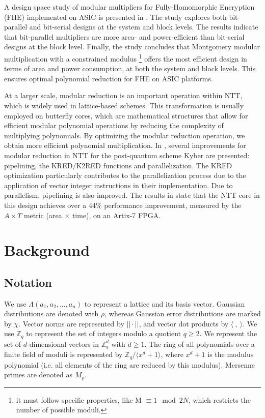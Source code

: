 \documentclass[11pt,
  titlepage=false,
  abstract=on,
]{scrreprt}
\begin{document}
A design space study of modular multipliers for Fully-Homomorphic Encryption (FHE) implemented on ASIC is presented in \cite{10129292}. The study explores both bit-parallel and bit-serial designs at the system and block levels. 
The results indicate that bit-parallel multipliers are more area- and power-efficient than bit-serial designs at the block level. Finally, the study concludes that Montgomery modular multiplication with a constrained modulus \footnote{it must follow specific properties, like M $\equiv 1 \mod 2N$, which restricts the number of possible moduli.}
offers the most efficient design in terms of area and power consumption, at both the system and block levels. This ensures optimal polynomial reduction for FHE on ASIC platforms.

At a larger scale, modular reduction is an important operation within NTT, which is widely used in lattice-based schemes. This transformation is usually employed on butterfly cores, which are mathematical structures that allow for
efficient modular polynomial operations by reducing the complexity of multiplying polynomials. By optimizing the modular reduction operation, we obtain more efficient polynomial multiplication. In \cite{9603378}, several 
improvements  for modular reduction in NTT for the post-quantum scheme Kyber \cite{bos2018crystals} are presented: pipelining, the KRED/K2RED functions \cite{longa2016speeding} and parallelization. The KRED optimization 
particularly contributes to the parallelization process due to the application of vector integer instructions in their implementation. Due to parallelism, pipelining is also improved. The results in \cite{9603378} state 
that the NTT core in this design achieves over a 44\% performance improvement, measured by the $A \times T$ metric (area $\times$ time), on an Artix-7 FPGA.



\section{Background}
\label{sec:background}

\subsection{Notation}
We use $\Lambda(a_1, a_2,..., a_n)$ to represent a lattice and its basis vector. Gaussian distributions are denoted with $\rho$, whereas Gaussian error distributions are marked by $\chi$.
Vector norms are represented by $|| \cdot ||$, and vector dot products by $\langle \ ,\ \rangle$.
We use $\mathbb{Z}_q$ to represent the set of integers modulo a quotient $q \geq 2$. We represent the set of $d$-dimensional vectors in $\mathbb{Z}^d_q$
with $d \geq 1$. The ring of all polynomials over a finite field of moduli is represented by $\mathbb{Z}_q / \langle x^d + 1\rangle$, where $x^d + 1$ is the modulus polynomial 
(i.e. all elements of the ring are reduced by this modulus). Mersenne primes are denoted as $M_p$.
\end{document}
